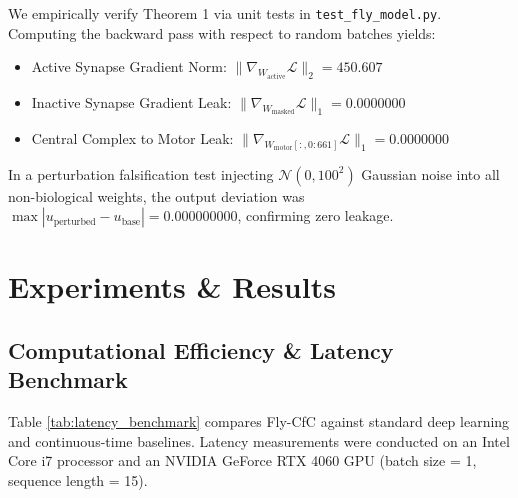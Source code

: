 \documentclass{article}
\begin{document}
We empirically verify Theorem 1 via unit tests in \texttt{test\_fly\_model.py}. Computing the backward pass with respect to random batches yields:
\begin{itemize}
    \item Active Synapse Gradient Norm: $\| \nabla_{W_{\text{active}}} \mathcal{L} \|_2 = 450.607$
    \item Inactive Synapse Gradient Leak: $\| \nabla_{W_{\text{masked}}} \mathcal{L} \|_1 = 0.0000000$
    \item Central Complex to Motor Leak: $\| \nabla_{W_{\text{motor}}[:, 0:661]} \mathcal{L} \|_1 = 0.0000000$
\end{itemize}
In a perturbation falsification test injecting $\mathcal{N}(0, 100^2)$ Gaussian noise into all non-biological weights, the output deviation was $\max | u_{\text{perturbed}} - u_{\text{base}} | = 0.000000000$, confirming zero leakage.

\section{Experiments \& Results}

\subsection{Computational Efficiency \& Latency Benchmark}
Table \ref{tab:latency_benchmark} compares Fly-CfC against standard deep learning and continuous-time baselines. Latency measurements were conducted on an Intel Core i7 processor and an NVIDIA GeForce RTX 4060 GPU (batch size = 1, sequence length = 15).

\begin{table}[t]
\centering
\caption{\textbf{Computational Efficiency and Inference Latency Benchmark.}}
\label{tab:latency_benchmark}
\end{table}
\end{document}
